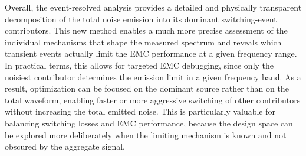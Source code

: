 Overall, the event-resolved analysis provides a detailed and physically transparent decomposition of the total noise emission into its dominant switching-event contributors. 
This new method enables a much more precise assessment of the individual mechanisms that shape the measured spectrum and reveals which transient events actually limit the EMC performance at a given frequency range. In practical terms, this allows for targeted EMC debugging, since only the noisiest contributor determines the emission limit in a given frequency band. 
As a result, optimization can be focused on the dominant source rather than on the total waveform, enabling faster or more aggressive switching of other contributors without increasing the total emitted noise. 
This is particularly valuable for balancing switching losses and EMC performance, because the design space can be explored more deliberately when the limiting mechanism is known and not obscured by the aggregate signal.

